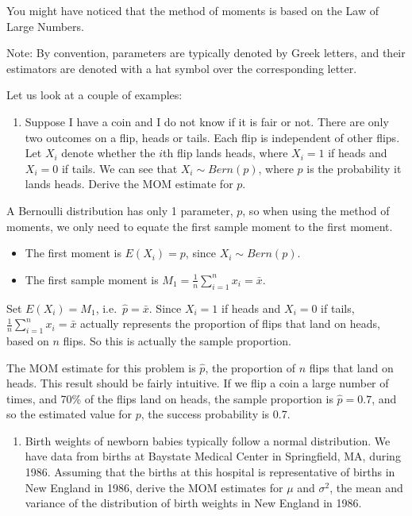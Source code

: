 \documentclass[
]{book}
\providecommand{\tightlist}{%
  \setlength{\itemsep}{0pt}\setlength{\parskip}{0pt}}
\begin{document}
You might have noticed that the method of moments is based on the Law of Large Numbers.

Note: By convention, parameters are typically denoted by Greek letters, and their estimators are denoted with a hat symbol over the corresponding letter.

Let us look at a couple of examples:

\begin{enumerate}
\def\labelenumi{\arabic{enumi}.}
\tightlist
\item
  Suppose I have a coin and I do not know if it is fair or not. There are only two outcomes on a flip, heads or tails. Each flip is independent of other flips. Let \(X_i\) denote whether the \(i\)th flip lands heads, where \(X_i = 1\) if heads and \(X_i = 0\) if tails. We can see that \(X_i \sim Bern(p)\), where \(p\) is the probability it lands heads. Derive the MOM estimate for \(p\).
\end{enumerate}

A Bernoulli distribution has only 1 parameter, \(p\), so when using the method of moments, we only need to equate the first sample moment to the first moment.

\begin{itemize}
\tightlist
\item
  The first moment is \(E(X_i) = p\), since \(X_i \sim Bern(p)\).
\item
  The first sample moment is \(M_1 = \frac{1}{n} \sum_{i=1}^n x_i = \bar{x}\).
\end{itemize}

Set \(E(X_i) = M_1\), i.e.~\(\hat{p} = \bar{x}\). Since \(X_i = 1\) if heads and \(X_i = 0\) if tails, \(\frac{1}{n} \sum_{i=1}^n x_i = \bar{x}\) actually represents the proportion of flips that land on heads, based on \(n\) flips. So this is actually the sample proportion.

The MOM estimate for this problem is \(\hat{p}\), the proportion of \(n\) flips that land on heads. This result should be fairly intuitive. If we flip a coin a large number of times, and 70\% of the flips land on heads, the sample proportion is \(\hat{p} = 0.7\), and so the estimated value for \(p\), the success probability is 0.7.

\begin{enumerate}
\def\labelenumi{\arabic{enumi}.}
\setcounter{enumi}{1}
\tightlist
\item
  Birth weights of newborn babies typically follow a normal distribution. We have data from births at Baystate Medical Center in Springfield, MA, during 1986. Assuming that the births at this hospital is representative of births in New England in 1986, derive the MOM estimates for \(\mu\) and \(\sigma^2\), the mean and variance of the distribution of birth weights in New England in 1986.
\end{enumerate}
\end{document}

